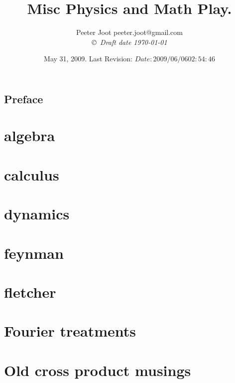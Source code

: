 \documentclass[12pt,leqno]{book}
\title{Misc Physics and Math Play.}
\author{Peeter Joot  \quad peeter.joot@gmail.com \\
{\small\em \copyright \  Draft date \today }}
\date{ May 31, 2009.  Last Revision: $Date: 2009/06/06 02:54:46 $ }
\begin{document}
\maketitle
\tableofcontents
\listoffigures
\listoftables
\chapter*{Preface}\normalsize
\pagestyle{plain}

%
\pagestyle{headings}


\part{algebra}





\part{calculus}





\part{dynamics}


\part{feynman}


\part{fletcher}


\part{Fourier treatments}


\part{Old cross product musings}


\end{document}
